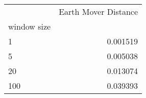 \begin{tabular}{lr}
\toprule
{} &  Earth Mover Distance \\
window size &                       \\
\midrule
1           &              0.001519 \\
5           &              0.005038 \\
20          &              0.013074 \\
100         &              0.039393 \\
\bottomrule
\end{tabular}
